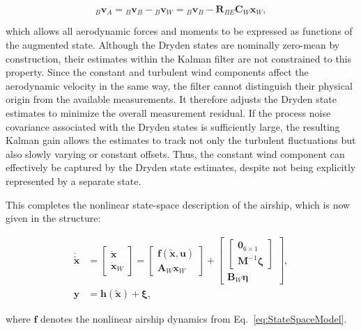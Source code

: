 \begin{equation}
	{}_B \bm{v}_A 
	= 
	{}_B \bm{v}_B - {}_B \bm{v}_W
	=
	{}_B \bm{v}_B - \bm{R}_{BE} \bm{C}_W \bm{x}_W ,
\end{equation}

which allows all aerodynamic forces and moments to be expressed as functions of the augmented state. Although the Dryden states are nominally zero-mean by construction, their estimates within the Kalman filter are not constrained to this property. Since the constant and turbulent wind components affect the aerodynamic velocity in the same way, the filter cannot distinguish their physical origin from the available measurements. It therefore adjusts the Dryden state estimates to minimize the overall measurement residual. If the process noise covariance associated with the Dryden states is sufficiently large, the resulting Kalman gain allows the estimates to track not only the turbulent fluctuations but also slowly varying or constant offsets. Thus, the constant wind component can effectively be captured by the Dryden state estimates, despite not being explicitly represented by a separate state.

This completes the nonlinear state-space description of the airship, which is now given in the structure:

\begin{align}
	\dot{\tilde{\bm{x}}} 
	&= 
	\begin{bmatrix}
		\dot{\bm{x}} \\ \dot{\bm{x}}_W
	\end{bmatrix}
	=
	\begin{bmatrix}
		\bm{f}(\tilde{\bm{x}}, \bm{u})
		\\
		\bm{A}_W \bm{x}_W
	\end{bmatrix}
	+ 
	\begin{bmatrix}
		\begin{bmatrix}
			\bm{0}_{6\times 1} \\ \bm{M}^{-1}\bm{\zeta}
		\end{bmatrix}
		\\[6pt]
		\bm{B}_W \bm{\eta}
	\end{bmatrix},
	\\[4pt]
	\bm{y} 
	&=
	\bm{h}(\tilde{\bm{x}}) + \bm{\xi},
\end{align}

where $\bm{f}$ denotes the nonlinear airship dynamics from Eq.~\eqref{eq:StateSpaceModel}.





